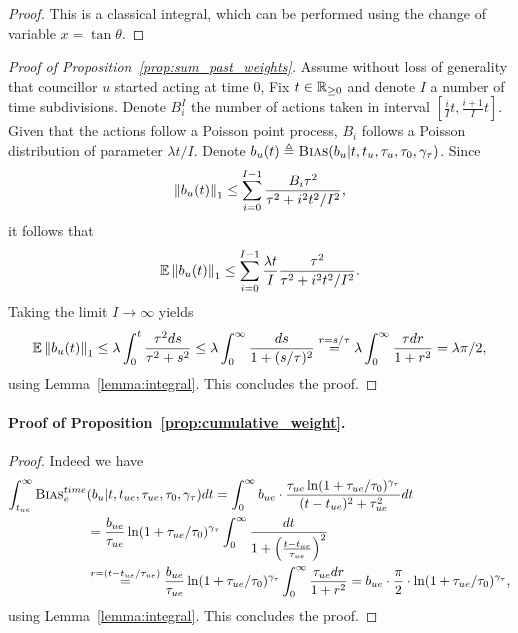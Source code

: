 \begin{proof}
    This is a classical integral, 
    which can be performed using the change of variable
    $x = \tan \theta$.
\end{proof}

\begin{proof}[Proof of Proposition~\ref{prop:sum_past_weights}]
    Assume without loss of generality that councillor $u$ started acting at time $0$,
    Fix $t \in \mathbb R_{\geq 0}$ and denote $I$ a number of time subdivisions.
    Denote $B_i^I$ the number of actions taken in interval 
    $\left[\frac{i}{I} t, \frac{i+1}{I} t \right]$.
    Given that the actions follow a Poisson point process, 
    $B_i$ follows a Poisson distribution of parameter $\lambda t / I$.
    Denote $b_u (t) \triangleq \textsc{Bias} (b_u | t, t_u, \tau_u, \tau_0, \gamma_\tau)$.
    Since
    \begin{align}
        \left\lVert{b_u (t)}\right\rVert_{1} 
        \leq \sum_{i = 0}^{I - 1} \frac{B_i \tau^2}{\tau^2 + i^2 t^2 / I^2},
    \end{align}
    it follows that 
    \begin{align}
        \mathbb E \left\lVert{b_u (t)}\right\rVert_{1} 
        \leq \sum_{i = 0}^{I - 1} 
            \frac{\lambda t}{I} \frac{\tau^2}{\tau^2 + i^2 t^2 / I^2}.
    \end{align}
    Taking the limit $I \to \infty$ yields
    \begin{align*}
        \mathbb E \left\lVert{b_u (t)}\right\rVert_{1}
        \leq \lambda \int_0^t \frac{\tau^2 ds}{\tau^2 + s^2} 
        \leq \lambda \int_0^\infty \frac{ds}{1 + (s/\tau)^2}
        \overset{r = s/\tau}{=} \lambda \int_0^\infty \frac{\tau dr}{1 + r^2} 
        = \lambda \pi / 2,
    \end{align*}
    using Lemma~\ref{lemma:integral}.
    This concludes the proof.
\end{proof}


\paragraph{Proof of Proposition~\ref{prop:cumulative_weight}.}

\begin{proof}
    Indeed we have
    \begin{align}
        \int_{t_{ue}}^\infty \textsc{Bias}^{time}_e &(
            b_u | t, t_{ue}, \tau_{ue}, \tau_0, \gamma_\tau
        ) dt
        = \int_0^\infty b_{ue} \cdot \frac{
            \tau_{ue} \ln (1+\tau_{ue} / \tau_0)^{\gamma_\tau}
        }{
            (t-t_{ue})^2 + \tau_{ue}^2
        } dt \\
        &= \frac{b_{ue}}{\tau_{ue}} \ln (1+\tau_{ue} / \tau_0)^{\gamma_\tau} 
        \int_0^\infty \frac{
            dt
        }{
            1 + \left( \frac{t-t_{ue}}{\tau_{ue}} \right)^2
        } \\
        &\overset{r = (t-t_{ue} / \tau_{ue})}{=} 
        \frac{b_{ue}}{\tau_{ue}} \ln (1+\tau_{ue} / \tau_0)^{\gamma_\tau} 
        \int_0^\infty \frac{
            \tau_{ue} dr
        }{
            1 + r^2
        }
        = b_{ue} \cdot \frac{\pi}{2} \cdot \ln (1+\tau_{ue} / \tau_0)^{\gamma_\tau},
    \end{align}
    using Lemma~\ref{lemma:integral}.
    This concludes the proof.
\end{proof}
